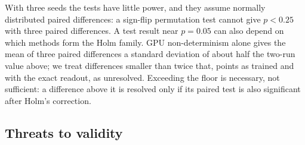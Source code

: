 With three seeds the tests have little power, and they assume normally distributed paired differences: a sign-flip permutation test cannot
give $p<0.25$ with three paired differences. A test result near $p=0.05$ can also depend on which methods form the Holm
family. GPU non-determinism alone gives the mean of three paired differences a standard deviation of about half the
two-run value above; we treat differences smaller than twice that,  points as trained and
 with the exact readout, as unresolved. Exceeding the floor is necessary, not sufficient: a
difference above it is resolved only if its paired test is also significant after Holm's correction.

\subsection{Threats to validity}\label{sec:setup-threats}

